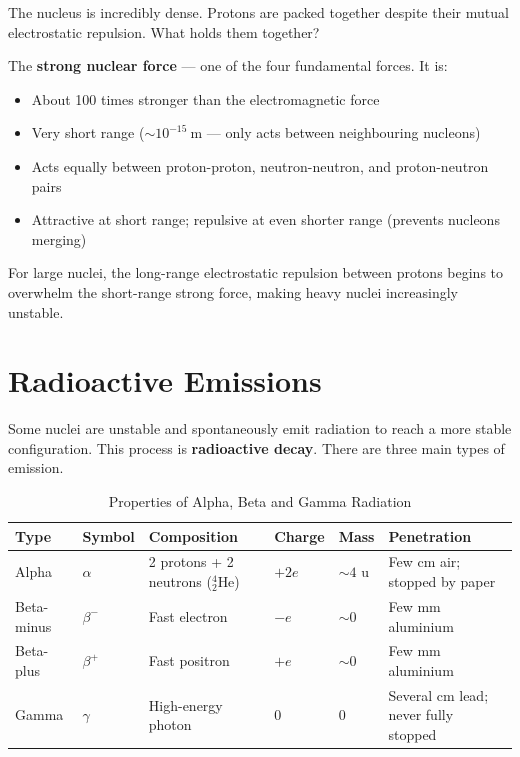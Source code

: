 \begin{keybox}
The nucleus is incredibly dense. Protons are packed
together despite their mutual electrostatic repulsion.
What holds them together?

The \textbf{strong nuclear force} --- one of the four
fundamental forces. It is:
\begin{itemize}[noitemsep]
  \item About 100 times stronger than the
  electromagnetic force
  \item Very short range ($\sim 10^{-15}\ \text{m}$
  --- only acts between neighbouring nucleons)
  \item Acts equally between proton-proton,
  neutron-neutron, and proton-neutron pairs
  \item Attractive at short range; repulsive at
  even shorter range (prevents nucleons merging)
\end{itemize}
For large nuclei, the long-range electrostatic
repulsion between protons begins to overwhelm the
short-range strong force, making heavy nuclei
increasingly unstable.
\end{keybox}

\section{Radioactive Emissions}

Some nuclei are unstable and spontaneously emit
radiation to reach a more stable configuration. This
process is \textbf{radioactive decay}. There are
three main types of emission.

\begin{table}[H]
\centering
\caption{Properties of Alpha, Beta and Gamma Radiation}
\label{tab:radiation_types}
\small
\begin{tabular}{llllll}
\toprule
\textbf{Type} & \textbf{Symbol} &
\textbf{Composition} & \textbf{Charge} &
\textbf{Mass} & \textbf{Penetration}\\
\midrule
Alpha & $\alpha$ & 2 protons + 2 neutrons (${}^4_2\text{He}$) &
  $+2e$ & $\sim 4$ u & Few cm air; stopped by paper\\
Beta-minus & $\beta^-$ & Fast electron & $-e$ &
  $\sim 0$ & Few mm aluminium\\
Beta-plus & $\beta^+$ & Fast positron & $+e$ &
  $\sim 0$ & Few mm aluminium\\
Gamma & $\gamma$ & High-energy photon & 0 &
  0 & Several cm lead; never fully stopped\\
\bottomrule
\end{tabular}
\end{table}

